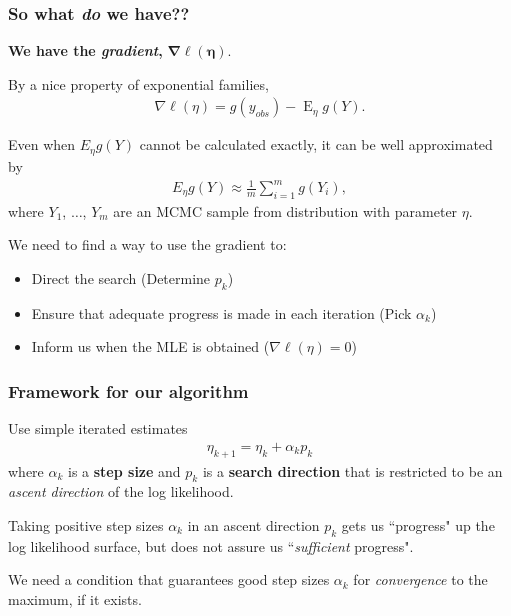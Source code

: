 \documentclass[ 10pt]{beamer}
\DeclareMathOperator{\E}{E}
\begin{document}
\frame
{
\frametitle{So what \emph{do} we have??}

{\textbf{We have the \emph{gradient},} $\boldsymbol{\nabla \ell(\eta)}$.}
\vspace*{2mm}

By a nice property of exponential families,
\begin{align*}
	\nabla \ell( \eta ) = g(y_{obs}) - \E_{\eta} g(Y).
\end{align*}

\pause
Even when $E_\eta g(Y)$ cannot be calculated exactly, it can be well approximated by
\begin{align*}
E_\eta g(Y) \approx \frac{1}{m}\sum_{i = 1}^m g(Y_i),
\end{align*}
where $Y_1$, $\ldots$, $Y_m$ are an MCMC sample from distribution with parameter $\eta$.
\vspace*{4mm}

\pause
We need to find a way to use the gradient to: 
\vspace*{2mm}
\begin{itemize}
\item Direct the search  (Determine $p_k$)
\vspace*{2mm}

\item Ensure that adequate progress is made in each iteration  (Pick $\alpha_k$)
\vspace*{2mm}

\item Inform us when the MLE is obtained  ($\nabla \ell(\eta) = 0$)
\end{itemize}

}

\frame
{
\frametitle{Framework for our algorithm}
Use simple iterated estimates
\begin{align*}
	\eta_{k+1} = \eta_k + \alpha_k p_k
\end{align*}
where $\alpha_k$ is a \textbf{step size} and  $p_k$ is a \textbf{search direction} that
is restricted to be an \emph{ascent direction} of the log likelihood.
\vspace{3mm}

\pause
Taking positive step sizes $\alpha_k$ in an ascent direction $p_k$ gets us ``progress" up the log 
likelihood surface, but does not assure us 
``\emph{sufficient} progress".
\vspace{3mm}

We need a condition that guarantees good step sizes $\alpha_k$ for \emph{convergence} to the maximum, if it exists.
}
\end{document}
